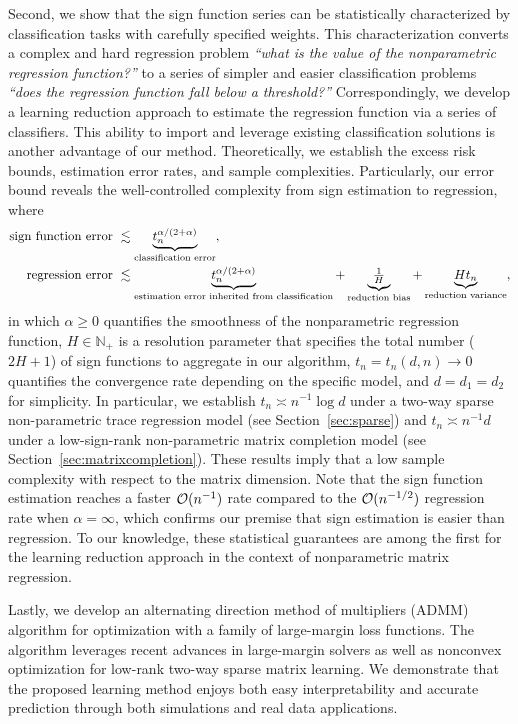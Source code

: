 \documentclass[aos]{imsart}
\theoremstyle{definition}
\newcommand*{\KeepStyleUnderBrace}[1]{%
\mathop{%
\mathchoice
{\underbrace{\displaystyle#1}}%
{\underbrace{\textstyle#1}}%
{\underbrace{\scriptstyle#1}}%
{\underbrace{\scriptscriptstyle#1}}%
}\limits
}
\begin{document}
Second, we show that the sign function series can be statistically characterized by classification tasks with carefully specified weights. This characterization converts a complex and hard regression problem \emph{``what is the value of the nonparametric regression function?''} to a series of simpler and easier classification problems \emph{``does the regression function fall below a threshold?''} Correspondingly, we develop a learning reduction approach to estimate the regression function via a series of classifiers. This ability to import and leverage existing classification solutions is another advantage of our method. Theoretically, we establish the excess risk bounds, estimation error rates, and sample complexities. Particularly, our error bound reveals the well-controlled complexity from sign estimation to regression, where 
\begin{align*}
\text{sign function error }& \lesssim \KeepStyleUnderBrace{t_n^{\alpha/( 2+\alpha)}}_{\text{classification error}},\\
\text{regression error } & \lesssim  \KeepStyleUnderBrace{t_n^{\alpha/(2+\alpha)}}_{\text{estimation error inherited from classification}}+\KeepStyleUnderBrace{\textstyle{1\over H}}_{\text{reduction bias}}+\KeepStyleUnderBrace{Ht_n}_{\text{reduction variance}},
\end{align*}
in which $\alpha\geq 0$ quantifies the smoothness of the nonparametric regression function, $H\in\mathbb{N}_{+}$ is a resolution parameter that specifies the total number ($2H+1$) of sign functions to aggregate in our algorithm, $t_n=t_n(d,n)\to 0$ quantifies the convergence rate depending on the specific model, and $d=d_1=d_2$ for simplicity. In particular, we establish $t_n\asymp n^{-1}\log d$ under a two-way sparse non-parametric trace regression model (see Section~\ref{sec:sparse}) and $t_n \asymp n^{-1}d$ under a low-sign-rank non-parametric matrix completion model (see Section~\ref{sec:matrixcompletion}). These results imply that a low sample complexity with respect to the matrix dimension. Note that the sign function estimation reaches a faster $\mathcal{O}(n^{-1})$ rate compared to the $\mathcal{O}(n^{-1/2})$ regression rate when $\alpha= \infty$, which confirms our premise that sign estimation is easier than regression. To our knowledge, these statistical guarantees are among the first for the learning reduction approach in the context of nonparametric matrix regression. 

Lastly, we develop an alternating direction method of multipliers (ADMM) algorithm for optimization with a family of large-margin loss functions. The algorithm leverages recent advances in large-margin solvers as well as nonconvex optimization for low-rank two-way sparse matrix learning. We demonstrate that the proposed learning method enjoys both easy interpretability and accurate prediction through both simulations and real data applications. 
\end{document}
